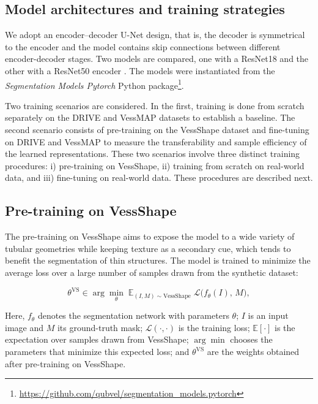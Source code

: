 \documentclass[%
reprint,
nofootinbib,
 amsmath,amssymb,
aps,
superscriptaddress,
showkeys,
longbibliography
]{revtex4-1}
\begin{document}
\subsection{Model architectures and training strategies}

We adopt an encoder–decoder U-Net design, that is, the decoder is symmetrical to the encoder and the model contains skip connections between different encoder-decoder stages. Two models are compared, one with a ResNet18 and the other with a ResNet50 encoder \cite{}. The models were instantiated from the \textit{Segmentation Models Pytorch} Python package\footnote{\url{https://github.com/qubvel/segmentation_models.pytorch}}.

Two training scenarios are considered. In the first, training is done from scratch separately on the DRIVE and VessMAP datasets to establish a baseline. The second scenario consists of pre-training on the VessShape dataset and fine-tuning on DRIVE and VessMAP to measure the transferability and sample efficiency of the learned representations. These two scenarios involve three distinct training procedures: i) pre-training on VessShape, ii) training from scratch on real-world data, and iii) fine-tuning on real-world data. These procedures are described next.

\subsection{Pre-training on VessShape}

The pre-training on VessShape aims to expose the model to a wide variety of tubular geometries while keeping texture as a secondary cue, which tends to benefit the segmentation of thin structures. The model is trained to minimize the average loss over a large number of samples drawn from the synthetic dataset:

\begin{equation}
    \theta^{\mathrm{VS}} \in \arg\min_{\theta} \; \mathbb{E}_{(I,M) \sim \mathrm{VessShape}} \; \mathcal{L}\big(f_{\theta}(I),\, M\big),
\end{equation}

Here, $f_{\theta}$ denotes the segmentation network with parameters $\theta$; $I$ is an input image and $M$ its ground-truth mask; $\mathcal{L}(\cdot,\cdot)$ is the training loss; $\mathbb{E}[\cdot]$ is the expectation over samples drawn from VessShape; $\arg\min$ chooses the parameters that minimize this expected loss; and $\theta^{\mathrm{VS}}$ are the weights obtained after pre-training on VessShape.
\end{document}
